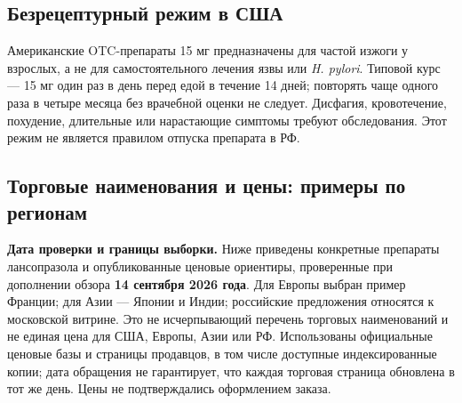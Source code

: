 \documentclass[11pt,a4paper,notitlepage]{report}
\newcommand{\Hp}{\textit{H. pylori}}
\newcommand{\src}[1]{\unskip\space\cite{#1}}
\begin{document}
\subsection{Безрецептурный режим в США}
Американские OTC-препараты 15 мг предназначены для частой изжоги у взрослых, а не для самостоятельного лечения язвы или \Hp. Типовой курс --- 15 мг один раз в день перед едой в течение 14 дней; повторять чаще одного раза в четыре месяца без врачебной оценки не следует. Дисфагия, кровотечение, похудение, длительные или нарастающие симптомы требуют обследования. Этот режим не является правилом отпуска препарата в РФ.\src{otc}

\subsection{Торговые наименования и цены: примеры по регионам}
\label{sec:brands-prices}
\textbf{Дата проверки и границы выборки.} Ниже приведены конкретные препараты лансопразола и опубликованные ценовые ориентиры, проверенные при дополнении обзора \textbf{14 сентября 2026 года}. Для Европы выбран пример Франции; для Азии --- Японии и Индии; российские предложения относятся к московской витрине. Это не исчерпывающий перечень торговых наименований и не единая цена для США, Европы, Азии или РФ. Использованы официальные ценовые базы и страницы продавцов, в том числе доступные индексированные копии; дата обращения не гарантирует, что каждая торговая страница обновлена в тот же день. Цены не подтверждались оформлением заказа.\src{priceusprev,priceusequate,pricefrbio,pricejptake,priceinlanzol,pricerulancid}
\end{document}
